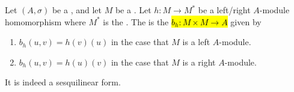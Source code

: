 \begin{definition} \label{definition:sesquilinear_form_associated_to_a_homomorphism_from_a_module_to_its_twisted_dual}
    Let $(A,\sigma)$ be a , and let $M$ be a . 
    Let $h: M \to M^*$ be a left/right $A$-module homomorphism where $M^*$ is the . The  is the  \hl{$b_h: M \times M \to A$} given by 
    \begin{enumerate}
        \item $b_h(u,v) = h(v)(u)$ in the case that $M$ is a left $A$-module. 
        \item $b_h(u,v) = h(u)(v)$ in the case that $M$ is a right $A$-module. 
    \end{enumerate}
    It is indeed a sesquilinear form.
\end{definition}